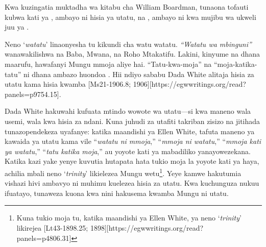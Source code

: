 \begin{table}[H]
    \centering
    \renewcommand{\arraystretch}{1.5}
    \setlength{\tabcolsep}{15pt}
    \end{table}

Kwa kuzingatia muktadha wa kitabu cha William Boardman, tunaona tofauti kubwa kati ya , ambayo ni hisia ya utatu, na , ambayo ni kwa mujibu wa ukweli juu ya .

Neno ‘\textit{watatu}’ linaonyesha tu kikundi cha watu watatu. \textit{“Watatu wa mbinguni”} wanawakilishwa na Baba, Mwana, na Roho Mtakatifu. Lakini, kinyume na dhana maarufu, hawafanyi Mungu mmoja aliye hai. “Tatu-kwa-moja” na “moja-katika-tatu” ni dhana ambazo huondoa . Hii ndiyo sababu Dada White alitaja hisia za utatu kama hisia kwamba [Ms21-1906.8; 1906][https://egwwritings.org/read?panels=p9754.15].

Dada White hakuwahi kufuata mtindo wowote wa utatu—si kwa maneno wala usemi, wala kwa hisia za ndani. Kuna juhudi za utafiti takriban zisizo na jitihada tunazopendekeza uyafanye: katika maandishi ya Ellen White, tafuta maneno ya kawaida ya utatu kama vile “\textit{watatu ni mmoja},” “\textit{mmoja ni watatu},” “\textit{mmoja kati ya watatu},” “\textit{tatu katika moja},” au yoyote kati ya mabadiliko yanayowezekana. Katika kazi yake yenye kuvutia hutapata hata tukio moja la yoyote kati ya haya, achilia mbali neno ‘\textit{trinity}’ likielezea Mungu wetu\footnote{Kuna tukio moja tu, katika maandishi ya Ellen White, ya neno ‘\textit{trinity}’ likirejea [Lt43-1898.25; 1898][https://egwwritings.org/read?panels=p4806.31]}. Yeye kamwe hakutumia vishazi hivi ambavyo ni muhimu kuelezea hisia za utatu. Kwa kuchunguza nukuu ifuatayo, tunaweza kuona kwa nini hakusema kwamba Mungu ni utatu.


